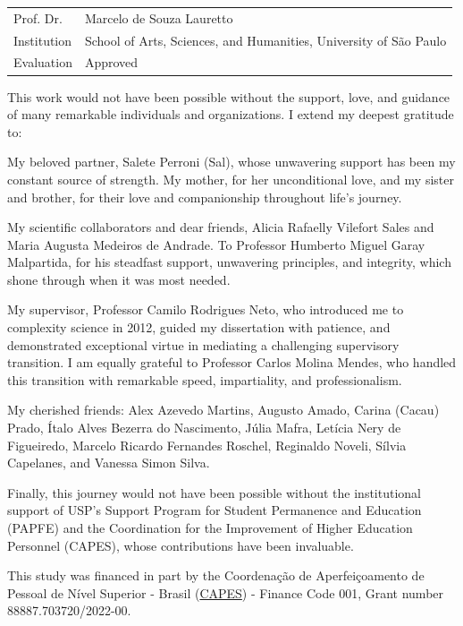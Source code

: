 \documentclass[
12pt,
openright,
oneside,
a4paper,
chapter=TITLE,
section=TITLE,
french,
spanish,
brazil,
english
]{abntex2}
\renewcommand{\baselinestretch}{1.5}
\renewcommand{\folhadeaprovacaoname}{Approval Sheet}
\renewcommand{\agradecimentosname}{Acknowledgements}
\renewcommand{\folhadeaprovacaoname}{Folha de Aprovação}
\renewcommand{\agradecimentosname}{Agradecimentos}
\renewcommand{\folhadeaprovacaoname}{Hoja de aprobación}
\renewcommand{\agradecimentosname}{Agradecimientos}
\renewcommand{\folhadeaprovacaoname}{Feuille d'Approbation}
\renewenvironment{folhadeaprovacao}[1][\folhadeaprovacaoname]{
  \clearpage
  \PRIVATEbookmarkthis{#1}
  \setlength\parindent{0cm}
  \AtBeginEnvironment{tabular}{\normalsize}
  \begin{SingleSpace}
}{
  \end{SingleSpace}
  \cleardoublepage
}
\begin{document}
\begin{folhadeaprovacao}[\folhadeaprovacaoname]
\vspace{\smallskipamount}
\begin{tabular}{m{2.5cm} m{13.5cm}}
  Prof. Dr. & Marcelo de Souza Lauretto \\
  Institution & School of Arts, Sciences, and Humanities, University of São Paulo \\
  Evaluation & Approved \\
\end{tabular}
\endgroup
\end{folhadeaprovacao}


\begin{agradecimentos}[\agradecimentosname]

This work would not have been possible without the support, love, and
guidance of many remarkable individuals and organizations. I extend my
deepest gratitude to:

\smallskip

My beloved partner, Salete Perroni (Sal), whose unwavering support has
been my constant source of strength. My mother, for her unconditional
love, and my sister and brother, for their love and companionship
throughout life's journey.

My scientific collaborators and dear friends, Alicia Rafaelly Vilefort
Sales and Maria Augusta Medeiros de Andrade. To Professor Humberto
Miguel Garay Malpartida, for his steadfast support, unwavering
principles, and integrity, which shone through when it was most needed.

My supervisor, Professor Camilo Rodrigues Neto, who introduced me to
complexity science in 2012, guided my dissertation with patience, and
demonstrated exceptional virtue in mediating a challenging supervisory
transition. I am equally grateful to Professor Carlos Molina Mendes, who
handled this transition with remarkable speed, impartiality, and
professionalism.

My cherished friends: Alex Azevedo Martins, Augusto Amado, Carina
(Cacau) Prado, Ítalo Alves Bezerra do Nascimento, Júlia Mafra, Letícia
Nery de Figueiredo, Marcelo Ricardo Fernandes Roschel, Reginaldo Noveli,
Sílvia Capelanes, and Vanessa Simon Silva.

Finally, this journey would not have been possible without the
institutional support of USP's Support Program for Student Permanence
and Education (PAPFE) and the Coordination for the Improvement of Higher
Education Personnel (CAPES), whose contributions have been invaluable.

\smallskip
\begingroup
\renewcommand{\baselinestretch}{1}

\noindent This study was financed in part by the Coordenação de
Aperfeiçoamento de Pessoal de Nível Superior - Brasil
(\href{https://www.gov.br/capes/}{CAPES}) - Finance Code 001, Grant
number 88887.703720/2022-00.

\endgroup

\end{agradecimentos}
\end{document}
